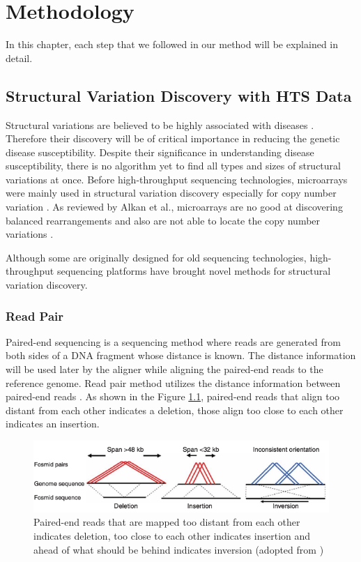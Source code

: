 \chapter{Methodology}
In this chapter, each step that we followed in our method will be explained in detail.
\section{Structural Variation Discovery with HTS Data}
Structural variations are believed to be highly associated with diseases \cite{fanciulli2007fcgr3b,fellermann2006chromosome,aitman2006copy,gonzalez2005influence}. Therefore their discovery will be of critical importance in reducing the genetic disease susceptibility. Despite their significance in understanding disease susceptibility, there is no algorithm yet to find all types and sizes of structural variations at once. Before high-throughput sequencing technologies, microarrays were mainly used in structural variation discovery especially for copy number variation \cite{alkan2011genome}. As reviewed by Alkan et al., microarrays are no good at discovering balanced rearrangements and also are not able to locate the copy number variations \cite{alkan2011genome}. 

Although some are originally designed for old sequencing technologies, high-throughput sequencing platforms have brought novel methods for structural variation discovery. 
\subsection{Read Pair}
Paired-end sequencing is a sequencing method where reads are generated from both sides of a DNA fragment whose distance is known. The distance information will be used later by the aligner while aligning the paired-end reads to the reference genome. Read pair method utilizes the distance information between paired-end reads \cite{tuzun2005fine}. As shown in the Figure \ref{readpair}, paired-end reads that align too distant from each other indicates a deletion, those align too close to each other indicates an insertion.

\begin{figure}[ht]
    \centering
    \includegraphics[scale=0.4]{images/readpair.png}
    \caption{Paired-end reads that are mapped too distant from each other indicates deletion, too close to each other indicates insertion and ahead of what should be behind indicates inversion (adopted from \cite{tuzun2005fine})}
    \label{readpair}
\end{figure}

